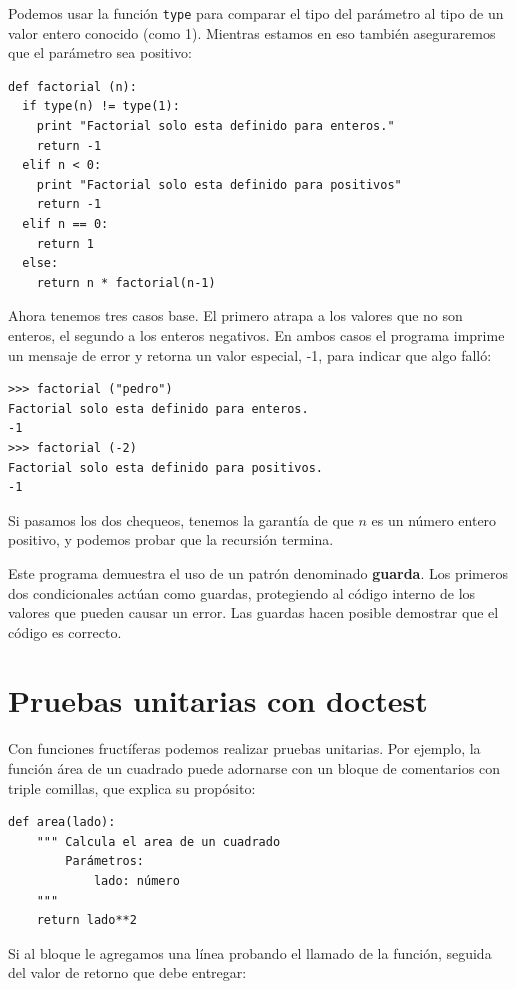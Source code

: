 
Podemos usar la función  \texttt{type} para comparar el tipo
del parámetro al tipo de un valor entero conocido (como 1).  
Mientras estamos en eso también aseguraremos que el parámetro
sea positivo:

\beforeverb
\begin{verbatim}
def factorial (n):
  if type(n) != type(1):
    print "Factorial solo esta definido para enteros."
    return -1
  elif n < 0:
    print "Factorial solo esta definido para positivos"
    return -1
  elif n == 0:
    return 1
  else:
    return n * factorial(n-1)
\end{verbatim}
\afterverb
%
Ahora tenemos tres casos base. El primero atrapa a los valores
que no son enteros, el segundo a los enteros negativos.
En ambos casos el programa imprime un mensaje de error y retorna
un valor especial, -1, para indicar que algo falló:

\beforeverb
\begin{verbatim}
>>> factorial ("pedro")
Factorial solo esta definido para enteros.
-1
>>> factorial (-2)
Factorial solo esta definido para positivos.
-1
\end{verbatim}
\afterverb
%
Si pasamos los dos chequeos, tenemos la garantía de que $n$ es 
un número entero  positivo, y podemos probar que la recursión termina.

Este programa demuestra el uso de un patrón denominado {\bf guarda}.
Los primeros dos condicionales actúan como guardas, protegiendo al 
código interno de los valores que pueden causar un error. Las 
guardas hacen posible demostrar que el código es correcto.

\section{Pruebas unitarias con doctest}

Con funciones fructíferas podemos realizar pruebas unitarias. Por ejemplo, 
la función área de un cuadrado puede adornarse con un bloque 
de comentarios con triple comillas, que explica su propósito:

\beforeverb
\begin{verbatim}
def area(lado):
    """ Calcula el area de un cuadrado
        Parámetros:
            lado: número
    """
    return lado**2
\end{verbatim}
\afterverb

Si al bloque le agregamos una línea probando el llamado de la función, 
seguida del valor de retorno que debe entregar:

